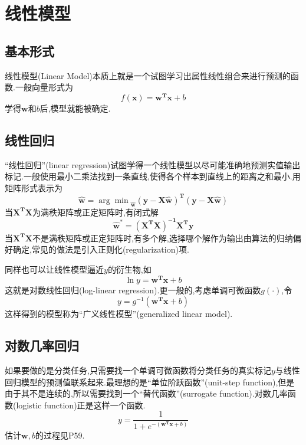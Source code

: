 \chapter{线性模型}

\section{基本形式}

线性模型(Linear Model)本质上就是一个试图学习出属性线性组合来进行预测的函数.一般向量形式为
\begin{equation}
f(\mathbf x)=\mathbf{w^Tx}+b
\end{equation}
学得$\mathbf w$和$b$后,模型就能被确定.

\section{线性回归}

``线性回归''(linear regression)试图学得一个线性模型以尽可能准确地预测实值输出标记.一般使用最小二乘法找到一条直线,使得各个样本到直线上的距离之和最小.用矩阵形式表示为
\begin{equation}
\mathbf{\hat w}={\arg\min}_{\mathbf{\hat w}}\mathbf{(y-X\hat w)^T(y-X\hat w)}
\end{equation}
当$\mathbf{X^TX}$为满秩矩阵或正定矩阵时,有闭式解
\begin{equation}
\mathbf{\hat w}^\ast=\mathbf{(X^TX)^{-1}X^Ty}
\end{equation}
当$\mathbf{X^TX}$不是满秩矩阵或正定矩阵时,有多个解,选择哪个解作为输出由算法的归纳偏好确定,常见的做法是引入正则化(regularization)项.

同样也可以让线性模型逼近$y$的衍生物,如
\begin{equation}
\ln y=\mathbf{w^Tx}+b
\end{equation}
这就是对数线性回归(log-linear regression).更一般的,考虑单调可微函数$g(\cdot)$,令
\begin{equation}
y=g^{-1}(\mathbf{w^Tx}+b)
\end{equation}
这样得到的模型称为``广义线性模型''(generalized linear model).

\section{对数几率回归}

如果要做的是分类任务,只需要找一个单调可微函数将分类任务的真实标记$y$与线性回归模型的预测值联系起来.最理想的是``单位阶跃函数''(unit-step function),但是由于其不是连续的,所以需要找到一个``替代函数''(surrogate function).对数几率函数(logistic function)正是这样一个函数.
\begin{equation}
y=\frac{1}{1+e^{-(\mathbf{w^Tx}+b)}}
\end{equation}
估计$\mathbf w,b$的过程见P59.

